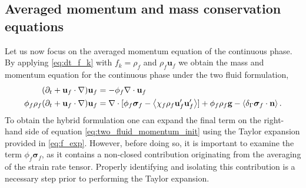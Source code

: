 







\subsection{Averaged momentum and mass conservation equations}



Let us now focus on the averaged momentum equation of the continuous phase. 
By applying \eqref{eq:dt_f_k} with $f_k = \rho_f$ and $\rho_f\textbf{u}_f$ we obtain the mass and momentum equation for the continuous phase under the two fluid formulation, 
\begin{align}
    (\pddt + \textbf{u}_f\cdot \grad)\textbf{u}_f&=-\phi_f \div \textbf{u}_f
    \label{eq:mass_init}\\
    \phi_f \rho_f(\pddt + \textbf{u}_f  \cdot \grad) \textbf{u}_f
    &= 
    \div [\phi_f \bm\sigma_f-  \avg{\chi_f\rho_f \textbf{u}_f'\textbf{u}_f'}]
    + \phi_f \rho_f \textbf{g}
    - \avg{\delta_\Gamma \bm\sigma_f\cdot \textbf{n}}.
    \label{eq:two_fluid_momentum_init}
\end{align} 
To obtain the hybrid formulation one can expand the final term on the right-hand side of equation \ref{eq:two_fluid_momentum_init} using the Taylor expansion provided in \ref{eq:f_exp}.  
However, before doing so, it is important to examine the term \( \phi_f \bm\sigma_f \), as it contains a non-closed contribution originating from the averaging of the strain rate tensor. %
Properly identifying and isolating this contribution is a necessary step prior to performing the Taylor expansion.


